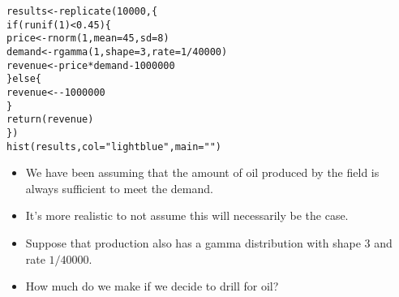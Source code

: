 \documentclass{beamer}\usepackage[]{graphicx}\usepackage[]{color}
\makeatletter
\newcommand{\hlnum}[1]{\textcolor[rgb]{0.824,0.412,0.118}{#1}}%
\newcommand{\hlstr}[1]{\textcolor[rgb]{1,0.894,0.71}{#1}}%
\newcommand{\hlopt}[1]{\textcolor[rgb]{1,0.894,0.769}{#1}}%
\newcommand{\hlstd}[1]{\textcolor[rgb]{1,0.894,0.769}{#1}}%
\newcommand{\hlkwa}[1]{\textcolor[rgb]{0.941,0.902,0.549}{#1}}%
\newcommand{\hlkwb}[1]{\textcolor[rgb]{0.804,0.776,0.451}{#1}}%
\newcommand{\hlkwc}[1]{\textcolor[rgb]{0.78,0.941,0.545}{#1}}%
\newcommand{\hlkwd}[1]{\textcolor[rgb]{1,0.78,0.769}{#1}}%
\newenvironment{kframe}{%
 \def\at@end@of@kframe{}%
 \ifinner\ifhmode%
  \def\at@end@of@kframe{\end{minipage}}%
  \begin{minipage}{\columnwidth}%
 \fi\fi%
 \def\FrameCommand##1{\hskip\@totalleftmargin \hskip-\fboxsep
 \colorbox{shadecolor}{##1}\hskip-\fboxsep
     \hskip-\linewidth \hskip-\@totalleftmargin \hskip\columnwidth}%
 \MakeFramed {\advance\hsize-\width
   \@totalleftmargin\z@ \linewidth\hsize
   \@setminipage}}%
 {\par\unskip\endMakeFramed%
 \at@end@of@kframe}
\newenvironment{knitrout}{}{} %
\makeatother
\begin{document}
\begin{darkframes}
    \begin{frame}[fragile]
      \fontsm
\begin{knitrout}
\begin{kframe}
\begin{alltt}
\hlstd{results} \hlkwb{<-} \hlkwd{replicate}\hlstd{(}\hlnum{10000}\hlstd{, \{}
  \hlkwa{if} \hlstd{(}\hlkwd{runif}\hlstd{(}\hlnum{1}\hlstd{)} \hlopt{<} \hlnum{0.45}\hlstd{) \{}
    \hlstd{price} \hlkwb{<-} \hlkwd{rnorm}\hlstd{(}\hlnum{1}\hlstd{,} \hlkwc{mean}\hlstd{=}\hlnum{45}\hlstd{,} \hlkwc{sd}\hlstd{=}\hlnum{8}\hlstd{)}
    \hlstd{demand} \hlkwb{<-} \hlkwd{rgamma}\hlstd{(}\hlnum{1}\hlstd{,} \hlkwc{shape}\hlstd{=}\hlnum{3}\hlstd{,} \hlkwc{rate}\hlstd{=}\hlnum{1}\hlopt{/}\hlnum{40000}\hlstd{)}
    \hlstd{revenue} \hlkwb{<-} \hlstd{price} \hlopt{*} \hlstd{demand} \hlopt{-} \hlnum{1000000}
  \hlstd{\}} \hlkwa{else} \hlstd{\{}
    \hlstd{revenue} \hlkwb{<-} \hlopt{-}\hlnum{1000000}
  \hlstd{\}}
  \hlkwd{return}\hlstd{(revenue)}
\hlstd{\})}
\hlkwd{hist}\hlstd{(results,} \hlkwc{col}\hlstd{=}\hlstr{"lightblue"}\hlstd{,} \hlkwc{main}\hlstd{=}\hlstr{""}\hlstd{)}
\end{alltt}
\end{kframe}


\end{knitrout}
    \end{frame}

    \begin{frame}
      \begin{itemize}[<+->]
        \item We have been assuming that the amount of oil produced by the field is always sufficient to meet the demand.
        \item It's more realistic to not assume this will necessarily be the case.
        \item Suppose that production also has a gamma distribution with shape 3 and rate $1/40000$.
        \item How much do we make if we decide to drill for oil?
      \end{itemize}

    \end{frame}


\end{darkframes}
\end{document}
